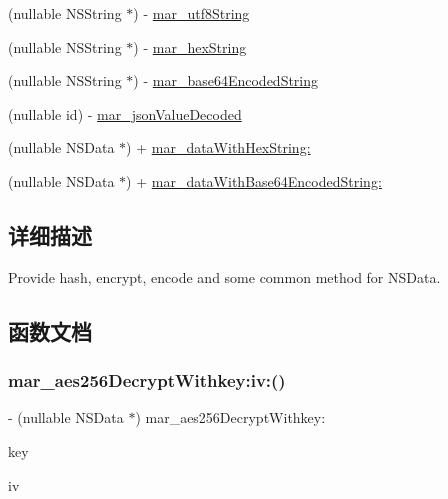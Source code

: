  \begin{DoxyCompactItemize}
\item 
(nullable N\+S\+String $\ast$) -\/ \hyperlink{category_n_s_data_07_m_a_r_e_x_08_ae3ff29313a92dd30365abaa22d72df08}{mar\+\_\+utf8\+String}
\item 
(nullable N\+S\+String $\ast$) -\/ \hyperlink{category_n_s_data_07_m_a_r_e_x_08_a6d4e17e002dae3e3abeacf467af5a20f}{mar\+\_\+hex\+String}
\item 
(nullable N\+S\+String $\ast$) -\/ \hyperlink{category_n_s_data_07_m_a_r_e_x_08_a800302925de72a0c2d29fb68b361965d}{mar\+\_\+base64\+Encoded\+String}
\item 
(nullable id) -\/ \hyperlink{category_n_s_data_07_m_a_r_e_x_08_a33703701ff3634b954f97780782442ee}{mar\+\_\+json\+Value\+Decoded}
\item 
(nullable N\+S\+Data $\ast$) + \hyperlink{category_n_s_data_07_m_a_r_e_x_08_aff742dcff64d959c4d7ddc8c037c7a5d}{mar\+\_\+data\+With\+Hex\+String\+:}
\item 
(nullable N\+S\+Data $\ast$) + \hyperlink{category_n_s_data_07_m_a_r_e_x_08_ab1e7d713c796f52a72c5a2f0d0458b91}{mar\+\_\+data\+With\+Base64\+Encoded\+String\+:}
\end{DoxyCompactItemize}


\subsection{详细描述}
Provide hash, encrypt, encode and some common method for {\ttfamily N\+S\+Data}. 

\subsection{函数文档}
\mbox{\label{category_n_s_data_07_m_a_r_e_x_08_a59e274308fa0837275615c3aa0d5d5bd}} 
\subsubsection{\texorpdfstring{mar\+\_\+aes256\+Decrypt\+Withkey\+:iv\+:()}{mar\_aes256DecryptWithkey:iv:()}\hspace{0.1cm}{\footnotesize\ttfamily [1/2]}}
{\footnotesize\ttfamily -\/ (nullable N\+S\+Data $\ast$) mar\+\_\+aes256\+Decrypt\+Withkey\+: \begin{DoxyParamCaption}\item[{(N\+S\+Data $\ast$)}]{key }\item[{iv:(nullable N\+S\+Data $\ast$)}]{iv }\end{DoxyParamCaption}}

